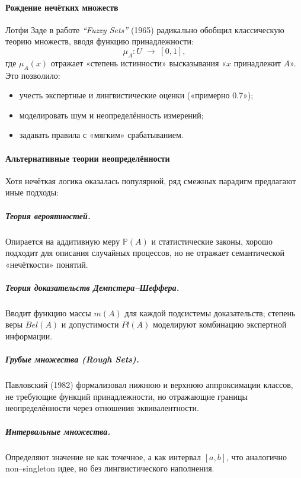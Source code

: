 \paragraph{Рождение нечётких множеств}

Лотфи Заде в работе \emph{“Fuzzy Sets”} (1965) радикально обобщил классическую теорию множеств, вводя функцию принадлежности:
\begin{equation}
  \mu_A: U \;\to\; [0,1],
  \label{eq:basic_mu}
\end{equation}
где $\mu_A(x)$ отражает «степень истинности» высказывания «$x$ принадлежит $A$». Это позволило:
\begin{itemize}
  \item учесть экспертные и лингвистические оценки («примерно 0.7»);
  \item моделировать шум и неопределённость измерений;
  \item задавать правила с «мягким» срабатыванием.
\end{itemize}

\paragraph{Альтернативные теории неопределённости}

Хотя нечёткая логика оказалась популярной, ряд смежных парадигм предлагают иные подходы:

\subparagraph{Теория вероятностей.}  

Опирается на аддитивную меру $\mathbb{P}(A)$ и статистические законы, хорошо подходит для описания случайных процессов, но не отражает семантической «нечёткости» понятий.

\subparagraph{Теория доказательств Демпстера–Шеффера.}  

Вводит функцию массы $m(A)$ для каждой подсистемы доказательств; степень веры $Bel(A)$ и допустимости $Pl(A)$ моделируют комбинацию экспертной информации.

\subparagraph{Грубые множества (Rough Sets).}  

Павловский (1982) формализовал нижнюю и верхнюю аппроксимации классов, не требующие функций принадлежности, но отражающие границы неопределённости через отношения эквивалентности.

\subparagraph{Интервальные множества.}  

Определяют значение не как точечное, а как интервал $[a,b]$, что аналогично non–singleton идее, но без лингвистического наполнения.

